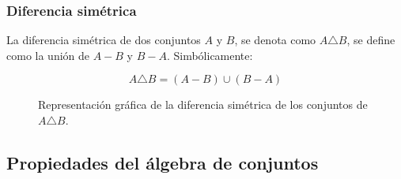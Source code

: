 \subsubsection{Diferencia simétrica}
La diferencia simétrica de dos conjuntos $A$ y $B$, se denota como $A \triangle
B$, se define como la unión de $A-B$ y $B-A$. Simbólicamente:

\begin{equation}
    A \triangle B = (A-B) \cup (B-A)
\end{equation}


\begin{figure}[h]
    \centering
    \caption{Representación gráfica de la diferencia simétrica de los conjuntos de $A \triangle B$.}
    \label{fig:diferenciaSimetricaConjuntos}
\end{figure}

\subsection{Propiedades del álgebra de conjuntos}

